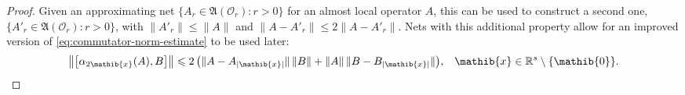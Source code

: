 \documentclass[a4paper,a4paper]{article}
\numberwithin{equation}{section}
\newcommand{\zeroib}{\mathib{0}}
\newcommand{\xib}{\mathib{x}}
\newcommand{\Rs}{\mathbb{R}^s}
\newcommand{\aibtwox}{\alpha_{2\mathib{x}}}
\newcommand{\AOr}{\mathfrak{A} ( \mathscr{O}_r )}
\theoremstyle{definition}
\theoremstyle{plain}
\theoremstyle{remark}
\newcommand{\set}[1]{\{ #1 \}}
\newcommand{\bset}[1]{\bigl\{ #1 \bigr\}}
\newcommand{\bcomm}[2]{\bigl[ #1 , #2 \bigr]}
\newcommand{\abs}[1]{\lvert #1 \rvert}
\newcommand{\norm}[1]{\lVert #1 \rVert}
\newcommand{\bnorm}[1]{\bigl\lVert #1 \bigr\rVert}
\begin{document}
  \begin{proof}
    Given an approximating net $\bset{A_r \in \AOr : r > 0}$ for an
    almost local operator $A$, this can be used to construct a second
    one, $\bset{A'_r \in \AOr : r > 0}$, with $\norm{A'_r} \leqslant
    \norm{A}$ and $\norm{A -A'_r} \leqslant 2 \norm{A -A'_r}$. Nets
    with this additional property allow for an improved version of
    \eqref{eq:commutator-norm-estimate} to be used later:
    \begin{equation}
      \label{eq:special-commutator-norm-estimate}
      \bnorm{\bcomm{\aibtwox ( A )}{B}} \leqslant 2 \, \bigl(
      \norm{A - A_{\abs{\xib}}} \, \norm{B} + \norm{A} \, \norm{B -
      B_{\abs{\xib}}} \bigr) \text{,} \quad \xib \in \Rs \setminus
      \set{\zeroib} \text{.}
    \end{equation}
    

\end{proof}
\end{document}
